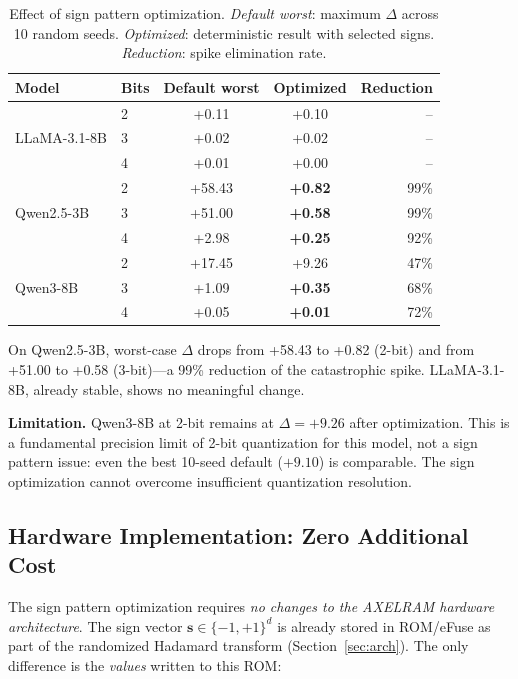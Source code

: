 \documentclass[conference]{IEEEtran}
\begin{document}
\begin{table}[t]
\centering
\caption{Effect of sign pattern optimization. \emph{Default worst}: maximum $\Delta$ across 10 random seeds. \emph{Optimized}: deterministic result with selected signs. \emph{Reduction}: spike elimination rate.}
\label{tab:optimization}
\setlength{\tabcolsep}{3.5pt}
\footnotesize
\begin{tabular}{llccr}
\toprule
\textbf{Model} & \textbf{Bits} & \textbf{Default worst} & \textbf{Optimized} & \textbf{Reduction} \\
\midrule
\multirow{3}{*}{LLaMA-3.1-8B}
& 2 & +0.11 & +0.10 & -- \\
& 3 & +0.02 & +0.02 & -- \\
& 4 & +0.01 & +0.00 & -- \\
\midrule
\multirow{3}{*}{Qwen2.5-3B}
& 2 & +58.43 & \textbf{+0.82} & 99\% \\
& 3 & +51.00 & \textbf{+0.58} & 99\% \\
& 4 & +2.98 & \textbf{+0.25} & 92\% \\
\midrule
\multirow{3}{*}{Qwen3-8B}
& 2 & +17.45 & +9.26 & 47\% \\
& 3 & +1.09 & \textbf{+0.35} & 68\% \\
& 4 & +0.05 & \textbf{+0.01} & 72\% \\
\bottomrule
\end{tabular}
\end{table}

On Qwen2.5-3B, worst-case $\Delta$ drops from +58.43 to +0.82 (2-bit) and from +51.00 to +0.58 (3-bit)---a 99\% reduction of the catastrophic spike.
LLaMA-3.1-8B, already stable, shows no meaningful change.

\textbf{Limitation.}
Qwen3-8B at 2-bit remains at $\Delta = +9.26$ after optimization.
This is a fundamental precision limit of 2-bit quantization for this model, not a sign pattern issue: even the best 10-seed default ($+9.10$) is comparable.
The sign optimization cannot overcome insufficient quantization resolution.

\subsection{Hardware Implementation: Zero Additional Cost}
\label{sec:hw_mitigation}

The sign pattern optimization requires \emph{no changes to the AXELRAM hardware architecture}.
The sign vector $\mathbf{s} \in \{-1,+1\}^d$ is already stored in ROM/eFuse as part of the randomized Hadamard transform (Section~\ref{sec:arch}).
The only difference is the \emph{values} written to this ROM:
\end{document}
